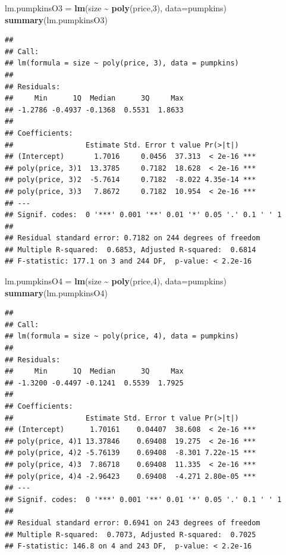 \documentclass[
]{book}
\newenvironment{Shaded}{\begin{snugshade}}{\end{snugshade}}
\newcommand{\AttributeTok}[1]{\textcolor[rgb]{0.13,0.29,0.53}{#1}}
\newcommand{\DecValTok}[1]{\textcolor[rgb]{0.00,0.00,0.81}{#1}}
\newcommand{\FunctionTok}[1]{\textcolor[rgb]{0.13,0.29,0.53}{\textbf{#1}}}
\newcommand{\NormalTok}[1]{#1}
\newcommand{\OtherTok}[1]{\textcolor[rgb]{0.56,0.35,0.01}{#1}}
\newcommand{\SpecialCharTok}[1]{\textcolor[rgb]{0.81,0.36,0.00}{\textbf{#1}}}
\begin{document}
\begin{Shaded}
\begin{Highlighting}[]
\NormalTok{lm.pumpkinsO3 }\OtherTok{=}  \FunctionTok{lm}\NormalTok{(size }\SpecialCharTok{\textasciitilde{}} \FunctionTok{poly}\NormalTok{(price,}\DecValTok{3}\NormalTok{), }\AttributeTok{data=}\NormalTok{pumpkins)}
\FunctionTok{summary}\NormalTok{(lm.pumpkinsO3)}
\end{Highlighting}
\end{Shaded}

\begin{verbatim}
## 
## Call:
## lm(formula = size ~ poly(price, 3), data = pumpkins)
## 
## Residuals:
##     Min      1Q  Median      3Q     Max 
## -1.2786 -0.4937 -0.1368  0.5531  1.8633 
## 
## Coefficients:
##                 Estimate Std. Error t value Pr(>|t|)    
## (Intercept)       1.7016     0.0456  37.313  < 2e-16 ***
## poly(price, 3)1  13.3785     0.7182  18.628  < 2e-16 ***
## poly(price, 3)2  -5.7614     0.7182  -8.022 4.35e-14 ***
## poly(price, 3)3   7.8672     0.7182  10.954  < 2e-16 ***
## ---
## Signif. codes:  0 '***' 0.001 '**' 0.01 '*' 0.05 '.' 0.1 ' ' 1
## 
## Residual standard error: 0.7182 on 244 degrees of freedom
## Multiple R-squared:  0.6853, Adjusted R-squared:  0.6814 
## F-statistic: 177.1 on 3 and 244 DF,  p-value: < 2.2e-16
\end{verbatim}

\begin{Shaded}
\begin{Highlighting}[]
\NormalTok{lm.pumpkinsO4 }\OtherTok{=}  \FunctionTok{lm}\NormalTok{(size }\SpecialCharTok{\textasciitilde{}} \FunctionTok{poly}\NormalTok{(price,}\DecValTok{4}\NormalTok{), }\AttributeTok{data=}\NormalTok{pumpkins)}
\FunctionTok{summary}\NormalTok{(lm.pumpkinsO4)}
\end{Highlighting}
\end{Shaded}

\begin{verbatim}
## 
## Call:
## lm(formula = size ~ poly(price, 4), data = pumpkins)
## 
## Residuals:
##     Min      1Q  Median      3Q     Max 
## -1.3200 -0.4497 -0.1241  0.5539  1.7925 
## 
## Coefficients:
##                 Estimate Std. Error t value Pr(>|t|)    
## (Intercept)      1.70161    0.04407  38.608  < 2e-16 ***
## poly(price, 4)1 13.37846    0.69408  19.275  < 2e-16 ***
## poly(price, 4)2 -5.76139    0.69408  -8.301 7.22e-15 ***
## poly(price, 4)3  7.86718    0.69408  11.335  < 2e-16 ***
## poly(price, 4)4 -2.96423    0.69408  -4.271 2.80e-05 ***
## ---
## Signif. codes:  0 '***' 0.001 '**' 0.01 '*' 0.05 '.' 0.1 ' ' 1
## 
## Residual standard error: 0.6941 on 243 degrees of freedom
## Multiple R-squared:  0.7073, Adjusted R-squared:  0.7025 
## F-statistic: 146.8 on 4 and 243 DF,  p-value: < 2.2e-16
\end{verbatim}
\end{document}
